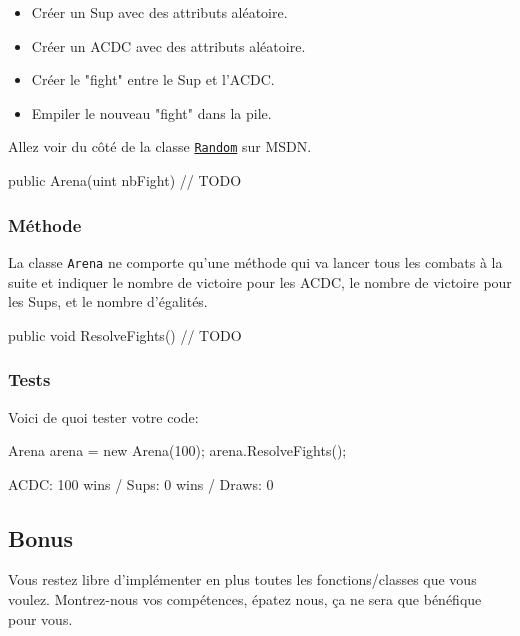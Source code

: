 \begin{itemize}
\item Créer un Sup avec des attributs aléatoire.
\item Créer un ACDC avec des attributs aléatoire.
\item Créer le "fight" entre le Sup et l'ACDC.
\item Empiler le nouveau "fight" dans la pile.
\end{itemize}

\begin{hint}
Allez voir du côté de la classe \href{https://msdn.microsoft.com/fr-fr/library/system.random(v=vs.110).aspx}{\texttt{Random}} sur MSDN.
\end{hint}

\begin{code}
public Arena(uint nbFight)
{
	// TODO
}
\end{code}

\subsubsection{Méthode}

La classe \texttt{Arena} ne comporte qu'une méthode qui va lancer tous les combats à la suite et indiquer le nombre de victoire pour les ACDC, le nombre de victoire pour les Sups, et le nombre d'égalités.

\begin{code}
public void ResolveFights()
{
	// TODO
}
\end{code}

\subsubsection{Tests}

Voici de quoi tester votre code:

\begin{code}
Arena arena = new Arena(100);
arena.ResolveFights();
\end{code}

\begin{shell}
ACDC: 100 wins / Sups: 0 wins / Draws: 0
\end{shell}

\subsection{Bonus}

Vous restez libre d'implémenter en plus toutes les fonctions/classes que vous voulez. Montrez-nous vos compétences, épatez nous, ça ne sera que bénéfique pour vous.